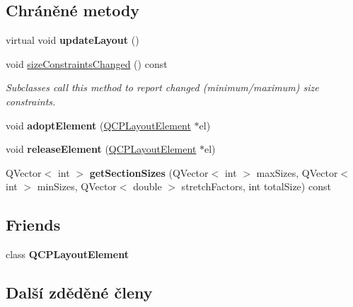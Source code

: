 \subsection*{Chráněné metody}
\begin{DoxyCompactItemize}
\item 
\hypertarget{classQCPLayout_a165c77f6287ac92e8d03017ad913378b}{}virtual void {\bfseries update\+Layout} ()\label{classQCPLayout_a165c77f6287ac92e8d03017ad913378b}

\item 
void \hyperlink{classQCPLayout_a6218cd7e5c0e30077c1aeaffe55b6145}{size\+Constraints\+Changed} () const 
\begin{DoxyCompactList}\small\item\em Subclasses call this method to report changed (minimum/maximum) size constraints. \end{DoxyCompactList}\item 
\hypertarget{classQCPLayout_af6dbbc24156a808da29cd1ec031729a3}{}void {\bfseries adopt\+Element} (\hyperlink{classQCPLayoutElement}{Q\+C\+P\+Layout\+Element} $\ast$el)\label{classQCPLayout_af6dbbc24156a808da29cd1ec031729a3}

\item 
\hypertarget{classQCPLayout_a4afbb4bef0071f72f91afdac4433a18e}{}void {\bfseries release\+Element} (\hyperlink{classQCPLayoutElement}{Q\+C\+P\+Layout\+Element} $\ast$el)\label{classQCPLayout_a4afbb4bef0071f72f91afdac4433a18e}

\item 
\hypertarget{classQCPLayout_a92d9dcd95e9510b323706ef7fc4ff62e}{}Q\+Vector$<$ int $>$ {\bfseries get\+Section\+Sizes} (Q\+Vector$<$ int $>$ max\+Sizes, Q\+Vector$<$ int $>$ min\+Sizes, Q\+Vector$<$ double $>$ stretch\+Factors, int total\+Size) const \label{classQCPLayout_a92d9dcd95e9510b323706ef7fc4ff62e}

\end{DoxyCompactItemize}
\subsection*{Friends}
\begin{DoxyCompactItemize}
\item 
\hypertarget{classQCPLayout_a0790750c7e7f14fdbd960d172655b42b}{}class {\bfseries Q\+C\+P\+Layout\+Element}\label{classQCPLayout_a0790750c7e7f14fdbd960d172655b42b}

\end{DoxyCompactItemize}
\subsection*{Další zděděné členy}



